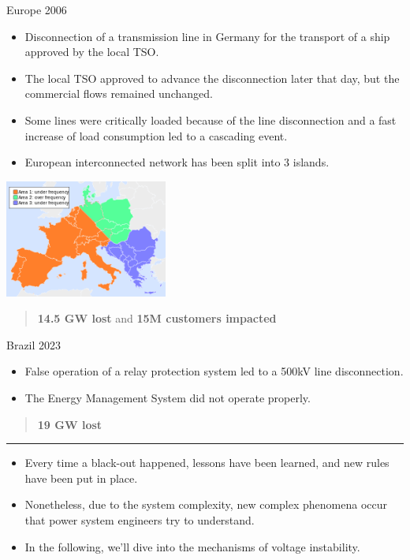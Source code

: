 \begin{frame}{Europe 2006}
\begin{itemize}
    \item Disconnection of a transmission line in Germany for the transport of a ship approved by the local TSO.
    \item The local TSO approved to advance the disconnection later that day, but the commercial flows remained unchanged.
    \item Some lines were critically loaded because of the line disconnection and a fast increase of load consumption led to a cascading event.
    \item European interconnected network has been split into 3 islands.
\end{itemize}
\vspace{0.5cm}
\begin{center}
\includegraphics[width=0.4\textwidth]{images/EuropeBlackOut.png}
\end{center}
\vspace{0.5cm}
\begin{quote}
    \textbf{14.5 GW lost} and \textbf{15M customers impacted} \cite{li2007analysis}
\end{quote}
\end{frame}

\begin{frame}{Brazil 2023}
\begin{itemize}
    \item False operation of a relay protection system led to a 500kV line disconnection.
    \item The Energy Management System did not operate properly.
\end{itemize}
\vspace{0.5cm}
\begin{quote}
    \textbf{19 GW lost}
\end{quote}
\vspace{0.5cm}
\hrule
\vspace{0.5cm}
\begin{itemize}
    \item Every time a black-out happened, lessons have been learned, and new rules have been put in place.
    \item Nonetheless, due to the system complexity, new complex phenomena occur that power system engineers try to understand.
    \item In the following, we'll dive into the mechanisms of voltage instability.
\end{itemize}
\end{frame}



